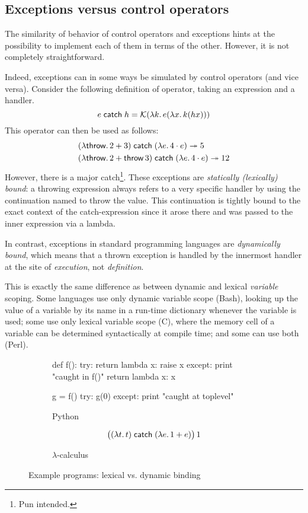 \subsection{Exceptions versus control operators}

The similarity of behavior of control operators and exceptions hints at the possibility
to implement each of them in terms of the other. However, it is not completely
straightforward.

Indeed, exceptions can in some ways be simulated by control operators (and vice versa).
Consider the following definition of  operator, taking an expression
and a handler.
\[	e \;\mathsf{catch}\; h = \mathcal{K}(\lambda k.\, e (\lambda x.\, k(h x))) \]
This operator can then be used as follows:
\begin{align*}
	&(\lambda \mathsf{throw}.\, 2 + 3) \;\mathsf{catch}\; (\lambda e.\, 4 \cdot e) \twoheadrightarrow 5 \\
	&(\lambda \mathsf{throw}.\, 2 + \mathsf{throw}\,3) \;\mathsf{catch}\; (\lambda e.\, 4 \cdot e) \twoheadrightarrow 12
\end{align*}
However, there is a major catch\footnote{Pun intended.}. These exceptions are \emph{statically
(lexically) bound}: a throwing expression always refers to a very specific handler
by using the continuation named  to throw the value. This continuation
is tightly bound to the exact context of the catch-expression since it arose there
and was passed to the inner expression via a lambda.

In contrast, exceptions in standard programming languages are \emph{dynamically bound}, which
means that a thrown exception is handled by the innermost handler at the site of \emph{execution},
not \emph{definition}.

This is exactly the same difference as between dynamic and lexical \emph{variable} scoping. Some
languages use only dynamic variable scope (Bash), looking up the value of a variable by its name
in a run-time dictionary whenever the variable is used; some use only lexical variable scope (C),
where the memory cell of a variable can be determined syntactically at compile time; and some can
use both (Perl).

\begin{figure}
\centering
\begin{subfigure}{0.45\textwidth}
\begin{codepy}
  def f():
    try:
      return lambda x: raise x
    except:
      print "caught in f()"
      return lambda x: x
      
  g = f()
  try:
    g(0)
  except:
    print "caught at toplevel"
\end{codepy}
\caption{Python}\label{fig:svd-python}
\end{subfigure}
\begin{subfigure}{0.45\textwidth}
\[ \big((\lambda t.\, t)\;\mathsf{catch}\;(\lambda e.\, 1 + e)\big)\, 1 \]
\caption{$\lambda$-calculus}\label{fig:svd-lc}
\end{subfigure}
\caption{Example programs: lexical vs. dynamic binding}
\end{figure}

